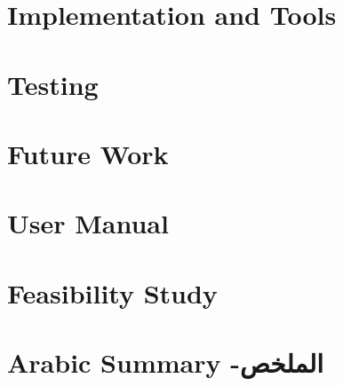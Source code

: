 \documentclass[12pt,twoside]{report}
\begin{document}
	\chapter{Implementation and Tools}
	
	
	\chapter{Testing}
	
	
	\chapter{Future Work}
	
	
	\renewcommand{\bibname}{References}
	\printbibliography
	
	\appendix
	\chapter{User Manual}
	
	
	\chapter{Feasibility Study}
	
	
	\chapter{Arabic Summary -\textarabic[utf]{الملخص}}
	
\end{document}
